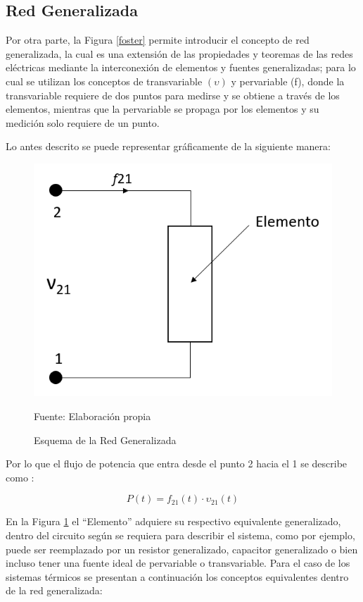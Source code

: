 \subsection{Red Generalizada}

Por otra parte, la Figura \ref{foster}  permite introducir el concepto de red generalizada, la cual es una extensión de las propiedades y teoremas de las redes eléctricas mediante la interconexión de elementos y fuentes generalizadas; para lo cual se utilizan  los conceptos de transvariable \( (\upsilon) \) y pervariable (f), donde la transvariable  requiere de dos puntos para medirse y se obtiene a través de los elementos, mientras que la pervariable se propaga por los elementos y su medición solo requiere de un punto. \cite{alfaro} 

Lo antes descrito se puede representar gráficamente de la siguiente manera:

\begin{figure}[H]
\centering
\includegraphics[scale=0.45]{Figuras/red.png}
\caption{Esquema de la Red Generalizada}
Fuente: Elaboración propia
\label{red}
\end{figure}


Por lo que el flujo de potencia que entra desde el punto 2 hacia el 1 se describe como \cite{alfaro}:

\begin{equation}\label{3}
    P(t) = f_{21}(t)\cdot \upsilon _{21}(t)
\end{equation}

En la Figura \ref{red} el ``Elemento'' adquiere su respectivo equivalente generalizado, dentro del circuito según se requiera para describir el sistema, como por ejemplo, puede ser reemplazado por un resistor generalizado, capacitor generalizado o bien incluso tener una fuente ideal de pervariable o transvariable. Para el caso de los sistemas térmicos se presentan a continuación los conceptos equivalentes dentro de la red generalizada:

